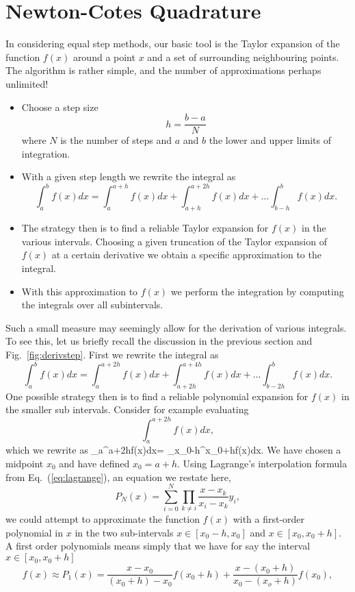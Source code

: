 \section{Newton-Cotes Quadrature}

In considering equal step  methods, our basic tool is the Taylor expansion
of the function $f(x)$ around a point $x$ and a set of surrounding 
neighbouring points. 
The algorithm is rather simple, and the number of approximations perhaps 
unlimited!
\begin{itemize}
   \item Choose a step size 
    \[ 
        h=\frac{b-a}{N}
    \]
   where $N$ is the number of steps and $a$ and $b$ the lower and upper limits
   of integration. 
\item With a given step length we rewrite the integral as
\[
    \int_a^bf(x) dx= \int_a^{a+h}f(x)dx + \int_{a+h}^{a+2h}f(x)dx+\dots \int_{b-h}^{b}f(x)dx.
\]
   \item 
The strategy then is to find a reliable Taylor expansion for $f(x)$ in the various intervals.  Choosing a given truncation of 
the Taylor expansion of $f(x)$ at a 
         certain derivative we obtain a specific approximation to the 
integral.
   \item With this approximation to $f(x)$ we perform the integration by computing the integrals over all subintervals.
\end{itemize}
Such a small measure may seemingly allow for the derivation of various integrals.
To see this, 
let us  briefly recall  the discussion in the previous section and 
Fig.\ \ref{fig:derivstep}. 
First we rewrite the integral as
\[
    \int_a^bf(x) dx= \int_a^{a+2h}f(x)dx + \int_{a+2h}^{a+4h}f(x)dx+\dots \int_{b-2h}^{b}f(x)dx.
\]
One possible strategy then is to find a reliable polynomial expansion for $f(x)$ in the smaller
sub intervals. Consider for example evaluating 
\[
   \int_a^{a+2h}f(x)dx, 
\]
which we rewrite as
\be
   \int_a^{a+2h}f(x)dx=
 \int_{x_0-h}^{x_0+h}f(x)dx.
     \label{eq:hhint}
\ee
We have chosen a midpoint $x_0$ and have defined $x_0=a+h$.
Using Lagrange's interpolation formula from Eq.~(\ref{eq:lagrange}), an equation we restate here,
\[
   P_N(x)=\sum_{i=0}^{N}\prod_{k\ne i} \frac{x-x_k}{x_i-x_k}y_i,
\]
we could attempt to approximate the function $f(x)$ with a first-order polynomial in $x$ in the two
sub-intervals $x\in[x_0-h,x_0]$ and $x\in[x_0,x_0+h]$. A first order polynomials means simply that 
we have for say the interval  $x\in[x_0,x_0+h]$
\[
   f(x)\approx P_1(x)=\frac{x-x_0}{(x_0+h)-x_0}f(x_0+h)+\frac{x-(x_0+h)}{x_0-(x_o+h)}f(x_0),
\]
